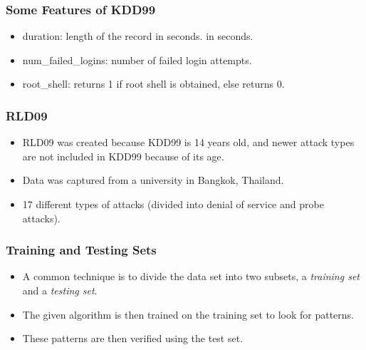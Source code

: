 \documentclass{beamer}
\begin{document}
\begin{frame}
  \frametitle{Some Features of KDD99}
	\begin{itemize}
		\item duration: length of the record in seconds.
in seconds.
		\item num\_failed\_logins: number of failed login attempts.
		\item root\_shell: returns 1 if root shell is obtained, else returns 0.
	\end{itemize}
\end{frame}



\begin{frame}
  \frametitle{RLD09}
	\begin{itemize}
		\item RLD09 was created because KDD99 is 14 years old, and newer attack types are not included in KDD99 because of its age.
		\item Data was captured from a university in Bangkok, Thailand.
		\item 17 different types of attacks (divided into denial of service and probe attacks).
	\end{itemize}
\end{frame}



\begin{frame}
  \frametitle{Training and Testing Sets}
	\begin{itemize}
		\item A common technique is to divide the data set into two subsets, a \emph{training set} and a \emph{testing set}.
        \item The given algorithm is then trained on the training set to look for patterns.
        \item These patterns are then verified using the test set.
	\end{itemize}
\end{frame}
\end{document}
